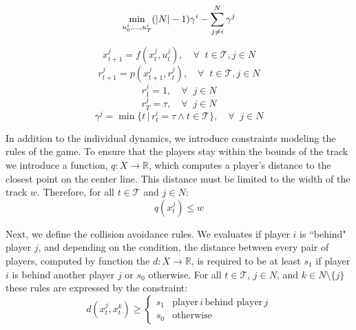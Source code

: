 \begin{equation} \label{eq:gen_obj}
    \min_{u^i_0, ..., u^i_T} (|N|-1)\gamma^i - \sum^N_{j \neq i}\gamma^j \\
\end{equation}

\begin{equation} \label{eq:gen_dyn}
    x^j_{t+1} = f(x^j_t, u^j_t), \quad \forall \;\; t \in \mathcal{T}, j \in N
\end{equation}
\begin{equation} \label{eq:gen_idx_map}
    r^j_{t+1} = p(x^j_{t+1}, r^j_t), \quad \forall \;\; t \in \mathcal{T}, j \in N
\end{equation}
\begin{equation} \label{eq:gen_init_idx}
    r^j_{1} = 1, \quad \forall \;\; j \in N
\end{equation}
\begin{equation} \label{eq:gen_reach_goal}
    r^j_{T} = \tau, \quad \forall \;\; j \in N
\end{equation}
\begin{equation} \label{eq:gen_goal_time}
    \gamma^j = \min \{t \, | \, r^i_t = \tau \wedge t \in \mathcal{T} \}, \quad \forall \;\; j \in N
\end{equation}
    
In addition to the individual dynamics, we introduce constraints modeling the rules of the game.  To ensure that the players stay within the bounds of the track we introduce a function, $q: X \rightarrow \mathbb{R}$, which computes a player's distance to the closest point on the center line. This distance must be limited to the width of the track $w$. Therefore, for all $t \in \mathcal{T}$ and $j \in N$:
\begin{equation} \label{eq:gen_idx_dist}
    q(x^j_{t}) \leq w
\end{equation}

Next, we define the collision avoidance rules. We evaluates if player $i$ is ``behind" player $j$, and depending on the condition, the distance between every pair of players, computed by function the $d: X \rightarrow \mathbb{R}$, is required to be at least $s_1$ if player $i$ is behind another player $j$ or $s_0$ otherwise. For all $t \in \mathcal{T}$, $j \in N$, and $k \in N \setminus \{j\}$ these rules are expressed by the constraint:
\begin{equation} \label{eq:gen_coll_avoid}
    d(x^j_{t}, x^k_t) \geq  \begin{cases} s_1 & \text{player} \, i \, \text{behind player}\,j\\
    s_0 & \text{otherwise}  \end{cases}
\end{equation}

